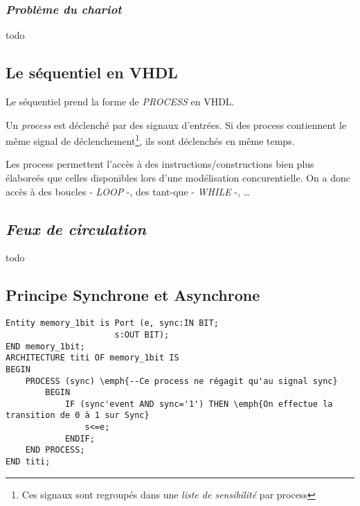 \documentclass[11.5pt]{report}
\begin{document}
\subsubsection{\emph{Problème du chariot}}
todo

\subsection{Le séquentiel en VHDL}
Le séquentiel prend la forme de \emph{PROCESS} en VHDL.
\par
Un \emph{process} est déclenché par des signaux d'entrées.
Si des process contiennent le même signal de déclenchement\footnote{Ces signaux sont regroupés dans une \emph{liste de sensibilité} par process}, ils sont déclenchés en même temps.
\par
Les process permettent l'accès à des instructions/constructions bien plus élaboreés que celles disponibles lors d'une modélisation concurentielle.
On a donc accès à des boucles - \emph{LOOP} -, des tant-que - \emph{WHILE} -, \ldots

\subsection{\emph{Feux de circulation}}
todo

\subsection{Principe Synchrone et Asynchrone}
\begin{verbatim}
Entity memory_1bit is Port (e, sync:IN BIT;
					  s:OUT BIT);
END memory_1bit;
ARCHITECTURE titi OF memory_1bit IS
BEGIN
	PROCESS (sync) \emph{--Ce process ne régagit qu'au signal sync}
		BEGIN
			IF (sync'event AND sync='1') THEN \emph{On effectue la transition de 0 à 1 sur Sync}
				s<=e;
			ENDIF;
	END PROCESS;
END titi;

\end{verbatim}
\end{document}
